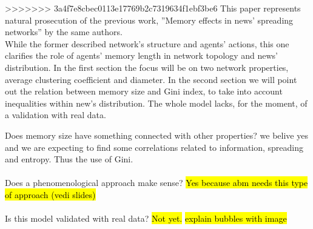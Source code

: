 >>>>>>> 3a4f7e8cbec0113e17769b2c7319634f1ebf3be6
This paper represents natural prosecution of the previous work,
''Memory effects in news' spreading networks'' by the same authors.\\
While the former described network's structure and agents' actions, this one clarifies the role of agents' memory length in network topology and news' distribution.
In the first section the focus will be on two network properties, average clustering coefficient and diameter.
In the second section we will point out the relation between memory size
and Gini index, to take into account inequalities within new's distribution. 
The whole model lacks, for the moment, of a validation with real data.

Does memory size have something connected with other properties?
we belive yes and we are expecting to find some correlations related
to information, spreading and entropy. Thus the use of Gini.\\ \\
Does a phenomenological approach make sense? \hl{Yes because abm needs
this type of approach (vedi slides)}\\ \\
Is this model validated with real data? \hl{Not yet.}
\hl{explain bubbles with image}